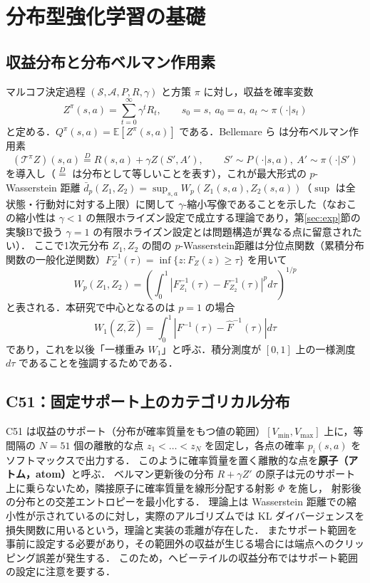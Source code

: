 \documentclass[a4paper,10pt]{jsarticle}
\theoremstyle{definition}
\newcommand{\Wone}{W_1}
\newcommand{\Finv}{F^{-1}}
\newcommand{\Fhinv}{\hat{F}^{-1}}
\newcommand{\E}{\mathbb{E}}
\begin{document}
\section{分布型強化学習の基礎}
\label{sec:drl}

\subsection{収益分布と分布ベルマン作用素}
マルコフ決定過程 $(\mathcal{S},\mathcal{A},P,R,\gamma)$ と方策 $\pi$ に対し，収益を確率変数
\begin{equation}
  Z^\pi(s,a)=\sum_{t=0}^{\infty}\gamma^t R_t,\qquad s_0=s,\ a_0=a,\ a_t\sim\pi(\cdot|s_t)
\end{equation}
と定める．$Q^\pi(s,a)=\E[Z^\pi(s,a)]$ である．Bellemare ら \cite{bellemare2017c51} は分布ベルマン作用素
\begin{equation}
  (\mathcal{T}^\pi Z)(s,a)\overset{D}{=}R(s,a)+\gamma Z(S',A'),\qquad S'\sim P(\cdot|s,a),\ A'\sim\pi(\cdot|S')
\end{equation}
を導入し（$\overset{D}{=}$ は分布として等しいことを表す），これが最大形式の $p$-Wasserstein 距離 $\bar d_p(Z_1,Z_2)=\sup_{s,a}W_p(Z_1(s,a),Z_2(s,a))$（$\sup$ は全状態・行動対に対する上限）に関して
$\gamma$-縮小写像であることを示した（なおこの縮小性は $\gamma<1$ の無限ホライズン設定で成立する理論であり，第\ref{sec:exp}節の実験Bで扱う $\gamma=1$ の有限ホライズン設定とは問題構造が異なる点に留意されたい）．
ここで1次元分布 $Z_1,Z_2$ の間の $p$-Wasserstein距離は分位点関数（累積分布関数の一般化逆関数）$F^{-1}_{Z}(\tau)=\inf\{z:F_Z(z)\ge\tau\}$ を用いて
\begin{equation}
  W_p(Z_1,Z_2)=\left(\int_0^1\left|F_{Z_1}^{-1}(\tau)-F_{Z_2}^{-1}(\tau)\right|^p d\tau\right)^{1/p}
  \label{eq:wp}
\end{equation}
と表される．本研究で中心となるのは $p=1$ の場合
\begin{equation}
  \Wone(Z,\hat Z)=\int_0^1\left|\Finv(\tau)-\Fhinv(\tau)\right|d\tau
  \label{eq:w1}
\end{equation}
であり，これを以後「一様重み $\Wone$」と呼ぶ．積分測度が $[0,1]$ 上の一様測度 $d\tau$ であることを強調するためである．

\subsection{C51：固定サポート上のカテゴリカル分布}
C51 \cite{bellemare2017c51} は収益のサポート（分布が確率質量をもつ値の範囲）$[V_{\min},V_{\max}]$ 上に，等間隔の $N=51$ 個の離散的な点
$z_1<\dots<z_N$ を固定し，各点の確率 $p_i(s,a)$ をソフトマックスで出力する．
このように確率質量を置く離散的な点を\textbf{原子（アトム，atom）}と呼ぶ．
ベルマン更新後の分布 $R+\gamma Z'$ の原子は元のサポート上に乗らないため，隣接原子に確率質量を線形分配する射影 $\Phi$ を施し，
射影後の分布との交差エントロピーを最小化する．
理論上は Wasserstein 距離での縮小性が示されているのに対し，実際のアルゴリズムでは KL ダイバージェンスを損失関数に用いるという，理論と実装の乖離が存在した．
またサポート範囲を事前に設定する必要があり，その範囲外の収益が生じる場合には端点へのクリッピング誤差が発生する．
このため，ヘビーテイルの収益分布ではサポート範囲の設定に注意を要する．
\end{document}
